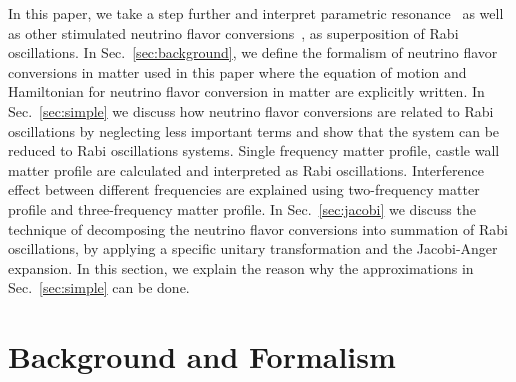 \documentclass[%
reprint,
 amsmath,amssymb,
 aps,
]{revtex4-1}
\begin{document}
In this paper, we take a step further and interpret parametric resonance~\cite{Akhmedov2000, Krastev1989} as well as other stimulated neutrino flavor conversions~\cite{Kneller2013, Patton2014}, as superposition of Rabi oscillations. In Sec.~\ref{sec:background}, we define the formalism of neutrino flavor conversions in matter used in this paper where the equation of motion and Hamiltonian for neutrino flavor conversion in matter are explicitly written. In Sec.~\ref{sec:simple} we discuss how neutrino flavor conversions are related to Rabi oscillations by neglecting less important terms and show that the system can be reduced to Rabi oscillations systems. Single frequency matter profile, castle wall matter profile are calculated and interpreted as Rabi oscillations. Interference effect between different frequencies are explained using two-frequency matter profile and three-frequency matter profile. In Sec.~\ref{sec:jacobi} we discuss the technique of decomposing the neutrino flavor conversions into summation of Rabi oscillations, by applying a specific unitary transformation and the Jacobi-Anger expansion. In this section, we explain the reason why the approximations in Sec.~\ref{sec:simple} can be done.



\section{\label{sec:background}Background and Formalism}

\end{document}
